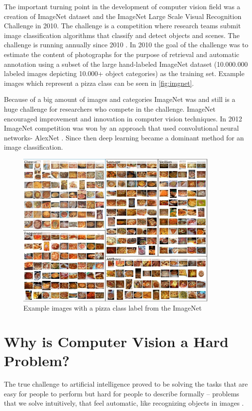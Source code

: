 The important turning point in the development of computer vision field was a creation of ImageNet dataset and the ImageNet Large Scale Visual Recognition Challenge in 2010. The challenge is a competition where research teams submit image classification algorithms that classify and detect objects and scenes. The challenge is running annually since 2010 \citep{ImageNet}. In 2010 the goal of the challenge was to estimate the content of photographs for the purpose of retrieval and automatic annotation using a subset of the large hand-labeled ImageNet dataset (10.000.000 labeled images depicting 10.000+ object categories) as the training set. Example images which represent a pizza class can be seen in \autoref{fig:imgnet}.


Because of a  big amount of images and categories ImageNet was and still is a huge challenge for researchers who compete in the challenge.  ImageNet encouraged improvement and innovation in computer vision techniques. In 2012 ImageNet competition was won by an approach that used convolutional neural networks- AlexNet \citep{alex}. Since then deep learning became a dominant method for an image classification. 


 \begin{figure}[h]
\centering
\includegraphics[width=10cm]{Figures/2/imgnet.PNG}
\caption{Example images with a pizza class label from the ImageNet }
\label{fig:imgnet}
\end{figure}


\section{Why is Computer Vision a Hard Problem?}
The true challenge to artificial intelligence proved to be solving the tasks that are easy for people to perform but hard for people to describe formally – problems that we solve intuitively, that feel automatic, like recognizing objects in images \citep{Goodfellow-et-al-2017}.


